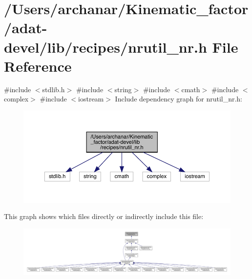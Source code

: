 \hypertarget{adat-devel_2lib_2recipes_2nrutil__nr_8h}{}\section{/\+Users/archanar/\+Kinematic\+\_\+factor/adat-\/devel/lib/recipes/nrutil\+\_\+nr.h File Reference}
\label{adat-devel_2lib_2recipes_2nrutil__nr_8h}
{\ttfamily \#include $<$stdlib.\+h$>$}\newline
{\ttfamily \#include $<$string$>$}\newline
{\ttfamily \#include $<$cmath$>$}\newline
{\ttfamily \#include $<$complex$>$}\newline
{\ttfamily \#include $<$iostream$>$}\newline
Include dependency graph for nrutil\+\_\+nr.\+h\+:
\nopagebreak
\begin{figure}[H]
\begin{center}
\leavevmode
\includegraphics[width=350pt]{da/dd4/adat-devel_2lib_2recipes_2nrutil__nr_8h__incl}
\end{center}
\end{figure}
This graph shows which files directly or indirectly include this file\+:
\nopagebreak
\begin{figure}[H]
\begin{center}
\leavevmode
\includegraphics[width=350pt]{d8/db9/adat-devel_2lib_2recipes_2nrutil__nr_8h__dep__incl}
\end{center}
\end{figure}
